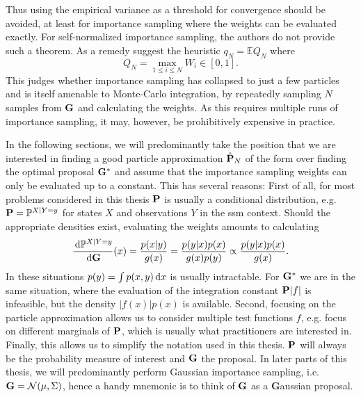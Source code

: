 Thus using the empirical variance as a threshold for convergence should be avoided, at least for importance sampling where the weights can be evaluated exactly. For self-normalized importance sampling, the authors do not provide such a theorem. As a remedy \citep{Chatterjee2018Sample} suggest the heuristic $q_{N} = \mathbb E Q_{N}$ where
$$
Q_{N} = \max_{1\leq i\leq N} W_{i} \in [0, 1].
$$
This judges whether importance sampling has collapsed to just a few particles and is itself amenable to Monte-Carlo integration, by repeatedly sampling $N$ samples from $\G$ and calculating the weights. 
As this requires multiple runs of importance sampling, it may, however, be prohibitively expensive in practice.

In the following sections, we will predominantly take the position that we are interested in finding a good particle approximation $\hat\P_{N}$ of the form  over finding the optimal proposal $\G^{\ast}$  and assume that the importance sampling weights can only be evaluated up to a constant. 
This has several reasons: First of all, for most problems considered in this thesis $\P$ is usually a conditional distribution, e.g. $\P = \mathbb P^{X|Y=y}$ for states $X$ and observations $Y$ in the \acrshort{ssm} context. Should the appropriate densities exist, evaluating the weights amounts to calculating 
$$
\rnd{\mathbb P^{X| Y= y}}{\G}(x) = \frac{p(x|y)}{g(x)} = \frac{p(y|x)p(x)}{g(x)p(y)} \propto \frac{p(y|x)p(x)}{g(x)}.
$$
In these situations $p(y) = \int p(x,y)\d x$ is usually intractable. For $\G^{\ast}$  we are in the same situation, where the evaluation of the integration constant $\P \lvert f \rvert$ is infeasible, but the density $\lvert f(x)\rvert p(x)$ is available.
Second, focusing on the particle approximation allows us to consider multiple test functions $f$, e.g. focus on different marginals of $\P$, which is usually what practitioners are interested in. 
Finally, this allows us to simplify the notation used in this thesis. $\P$ will always be the probability measure of interest and $\G$ the proposal. In later parts of this thesis, we will predominantly perform Gaussian importance sampling, i.e. $\G = \mathcal N(\mu, \Sigma)$, hence a handy mnemonic is to think of $\G$ as a \textbf{G}aussian proposal.

